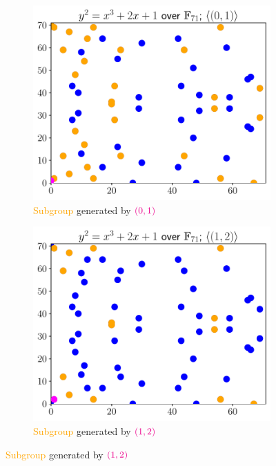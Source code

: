\begin{figure}[p]
\centering
    \begin{subfigure}[t]{0.45\textwidth}
    \includegraphics[width=\textwidth]{plots/ec_finite/ec_finite_F_71_2_1_subgroup_0_1.pdf}
    \caption{\textcolor{orange}{Subgroup} generated by
        $\color{magenta} \left( 0,1 \right)$}
    \label{fig:ec_finite_plots_subgroups_0_1}
    \end{subfigure}
    \begin{subfigure}[t]{0.45\textwidth}
    \includegraphics[width=\textwidth]{plots/ec_finite/ec_finite_F_71_2_1_subgroup_1_2.pdf}
    \caption{\textcolor{orange}{Subgroup} generated by
        $\color{magenta}\left( 1,2 \right)$}
    \label{fig:ec_finite_plots_subgroups_1_2}
    \end{subfigure}


\end{figure}
